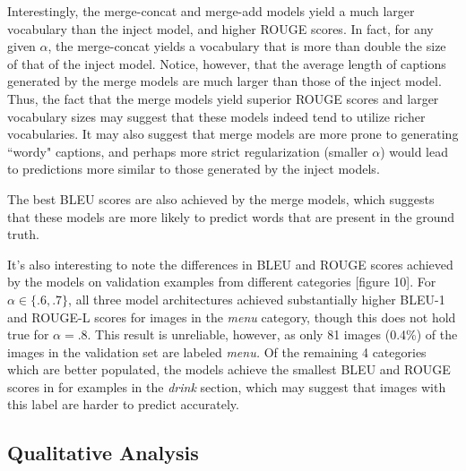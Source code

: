 \documentclass[letterpaper, 10 pt, conference]{ieeeconf}
\begin{document}
Interestingly, the merge-concat and merge-add models yield a much larger vocabulary than the inject model, and higher ROUGE scores. In fact, for any given $\alpha$, the merge-concat yields a vocabulary that is more than double the size of that of the inject model. Notice, however, that the average length of captions generated by the merge models are much larger than those of the inject model. Thus, the fact that the merge models yield superior ROUGE scores and larger vocabulary sizes may suggest that these models indeed tend to utilize richer vocabularies. It may also suggest that merge models are more prone to generating ``wordy" captions, and perhaps more strict regularization (smaller $\alpha$) would lead to predictions more similar to those generated by the inject models.

The best BLEU scores are also achieved by the merge models, which suggests that these models are more likely to predict words that are present in the ground truth.

It's also interesting to note the differences in BLEU and ROUGE scores achieved by the models on validation examples from different categories [figure 10]. For $\alpha \in \{.6, .7\}$, all three model architectures achieved substantially higher BLEU-1 and ROUGE-L scores for images in the \textit{menu} category, though this does not hold true for $\alpha = .8$. This result is unreliable, however, as only 81 images (0.4\%) of the images in the validation set are labeled \textit{menu.} Of the remaining 4 categories which are better populated, the models achieve the smallest BLEU and ROUGE scores in for examples in the \textit{drink} section, which may suggest that images with this label are harder to predict accurately.

\subsection{Qualitative Analysis}
\end{document}
